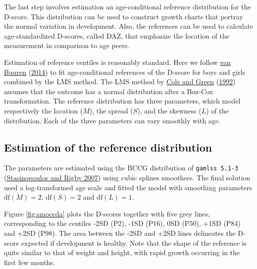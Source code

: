 \documentclass[
]{book}
\begin{document}
The last step involves estimation an age-conditional reference distribution for the D-score. This distribution can be used to construct growth charts that portray the normal variation in development. Also, the references can be used to calculate age-standardized D-scores, called DAZ, that emphasize the location of the measurement in comparison to age peers.

Estimation of reference centiles is reasonably standard. Here we follow \protect\hyperlink{ref-vanbuuren2014}{van Buuren} (\protect\hyperlink{ref-vanbuuren2014}{2014}) to fit age-conditional references of the D-score for boys and girls combined by the LMS method. The LMS method by \protect\hyperlink{ref-cole1992}{Cole and Green} (\protect\hyperlink{ref-cole1992}{1992}) assumes that the outcome has a normal distribution after a Box-Cox transformation. The reference distribution has three parameters, which model respectively the location (\(M\)), the spread (\(S\)), and the skewness (\(L\)) of the distribution. Each of the three parameters can vary smoothly with age.

\hypertarget{estimation-of-the-reference-distribution}{%
\subsection{Estimation of the reference distribution}\label{estimation-of-the-reference-distribution}}

The parameters are estimated using the BCCG distribution of \texttt{gamlss\ 5.1-3} (\protect\hyperlink{ref-stasinopoulos2007}{Stasinopoulos and Rigby 2007}) using cubic splines smoothers. The final solution used a log-transformed age scale and fitted the model with smoothing parameters \(\mathrm{df}(M)=2\), \(\mathrm{df}(S)=2\) and \(\mathrm{df}(L)=1\).

Figure \ref{fig:smoccda} plots the D-scores together with five grey lines, corresponding to the centiles -2SD (P2), -1SD (P16), 0SD (P50), +1SD (P84) and +2SD (P98). The area between the -2SD and +2SD lines delineates the D-score expected if development is healthy. Note that the shape of the reference is quite similar to that of weight and height, with rapid growth occurring in the first few months.
\end{document}

